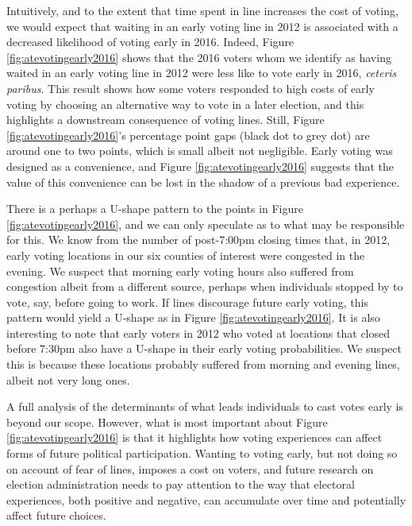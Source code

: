 \documentclass[12pt,titlepage]{article}
\begin{document}
Intuitively, and to the extent that time spent in line increases the
cost of voting, we would expect that waiting in an early voting line
in 2012 is associated with a decreased likelihood of voting early in
2016.  Indeed, Figure \ref{fig:atevotingearly2016} shows that the 2016
voters whom we identify as having waited in an early voting line in
2012 were less like to vote early in 2016, \emph{ceteris paribus}.
This result shows how some voters responded to high costs of early
voting by choosing an alternative way to vote in a later election, and
this highlights a downstream consequence of voting lines.  Still,
Figure \ref{fig:atevotingearly2016}'s percentage point gaps (black dot
to grey dot) are around one to two points, which is small albeit not
negligible.  Early voting was designed as a convenience, and Figure
\ref{fig:atevotingearly2016} suggests that the value of this
convenience can be lost in the shadow of a previous bad experience.

There is a perhaps a U-shape pattern to the points in Figure
\ref{fig:atevotingearly2016}, and we can only speculate as to what may
be responsible for this. We know from the number of post-7:00pm
closing times that, in 2012, early voting locations in our six
counties of interest were congested in the evening. We suspect that
morning early voting hours also suffered from congestion albeit from a
different source, perhaps when individuals stopped by to vote, say,
before going to work. If lines discourage future early voting, this
pattern would yield a U-shape as in Figure
\ref{fig:atevotingearly2016}. It is also interesting to note that
early voters in 2012 who voted at locations that closed before 7:30pm
also have a U-shape in their early voting probabilities. We suspect
this is because these locations probably suffered from morning and
evening lines, albeit not very long ones.


A full analysis of the determinants of what leads individuals to cast
votes early is beyond our scope.  However, what is most important
about Figure \ref{fig:atevotingearly2016} is that it highlights how
voting experiences can affect forms of future political participation.
Wanting to voting early, but not doing so on account of fear of lines,
imposes a cost on voters, and future research on election
administration needs to pay attention to the way that electoral
experiences, both positive and negative, can accumulate over time and
potentially affect future choices.
\end{document}
